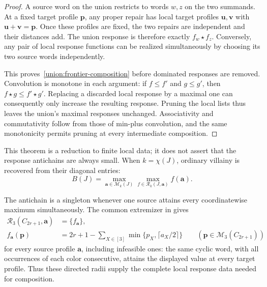 \documentclass[10pt,a4paper]{amsart}
\numberwithin{equation}{section}
\theoremstyle{definition}
\theoremstyle{remark}
\begin{document}
\begin{proof}
A source word on the union restricts to words $w,z$ on the two
summands. At a fixed target profile $\mathbf p$, any proper repair
has local target profiles $\mathbf u,\mathbf v$ with
$\mathbf u+\mathbf v=\mathbf p$. Once these profiles are fixed,
the two repairs are independent and their distances add. The union
response is therefore exactly $f_w\star f_z$. Conversely, any pair
of local response functions can be realized simultaneously by choosing
its two source words independently.

This proves~\eqref{union:frontier-composition} before dominated
responses are removed. Convolution is monotone in each argument:
if $f\le f'$ and $g\le g'$, then $f\star g\le f'\star g'$.
Replacing a discarded local response by a maximal one can consequently
only increase the resulting response. Pruning the local lists thus
leaves the union's maximal responses unchanged. Associativity and
commutativity follow from those of min-plus convolution, and the same
monotonicity permits pruning at every intermediate composition.
\end{proof}


This theorem is a reduction to finite local data; it does not assert
that the response antichains are always small. When $k=\chi(J)$,
ordinary villainy is recovered from their diagonal entries:
\begin{equation}\label{union:response-diagonal}
 B(J)=\max_{\mathbf a\in\mathcal M_k(J)}
       \max_{f\in\mathcal R_k(J,\mathbf a)}f(\mathbf a).
\end{equation}

The antichain is a singleton whenever one source attains every
coordinatewise maximum simultaneously. The common extremizer in
\cite[Theorem~3.15]{jiang2026exact} gives
\[
\begin{aligned}
 \mathcal R_3(C_{2r+1},\mathbf a)&=\{f_{\mathbf a}\},\\
 f_{\mathbf a}(\mathbf p)&=2r+1-
 \sum_{X\in[3]}\min\{p_X,\lceil a_X/2\rceil\}
 \qquad(\mathbf p\in\mathcal M_3(C_{2r+1}))
\end{aligned}
\]
for every source profile $\mathbf a$, including infeasible ones:
the same cyclic word, with all occurrences of each color consecutive,
attains the displayed value at every target profile.
Thus these directed radii supply the complete local response
data needed for composition.
\end{document}
